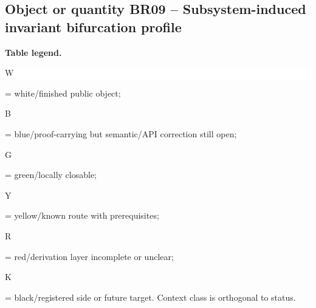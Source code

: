 \subsection*{Object or quantity BR09 -- Subsystem-induced invariant bifurcation profile}
\hypertarget{objproof:BR09}{}
\par\smallskip\noindent\begin{minipage}{0.99\linewidth}\footnotesize\raggedright\textbf{Table legend.} \colorbox{white}{\strut W} = white/finished public object; \colorbox{cyan!20}{\strut B} = blue/proof-carrying but semantic/API correction still open; \colorbox{green!18}{\strut G} = green/locally closable; \colorbox{yellow!25}{\strut Y} = yellow/known route with prerequisites; \colorbox{red!20}{\strut R} = red/derivation layer incomplete or unclear; \colorbox{black!18}{\strut K} = black/registered side or future target. Context class is orthogonal to status.\end{minipage}\par\vspace{0.25em}
